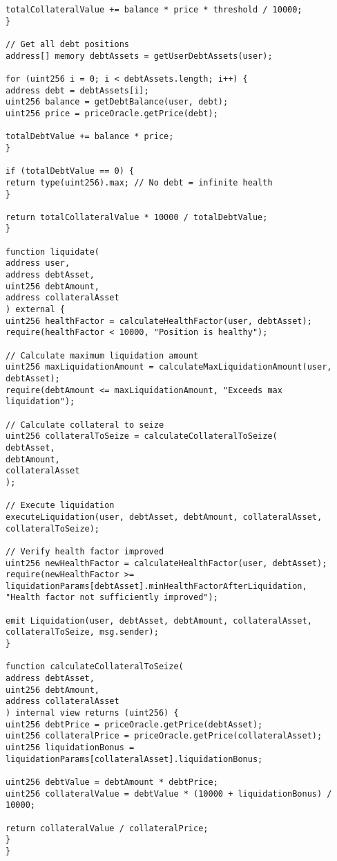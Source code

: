 \documentclass[12pt]{article}
\begin{document}
{{{\begin{lstlisting}
totalCollateralValue += balance * price * threshold / 10000;
}

// Get all debt positions
address[] memory debtAssets = getUserDebtAssets(user);

for (uint256 i = 0; i < debtAssets.length; i++) {
address debt = debtAssets[i];
uint256 balance = getDebtBalance(user, debt);
uint256 price = priceOracle.getPrice(debt);

totalDebtValue += balance * price;
}

if (totalDebtValue == 0) {
return type(uint256).max; // No debt = infinite health
}

return totalCollateralValue * 10000 / totalDebtValue;
}

function liquidate(
address user,
address debtAsset,
uint256 debtAmount,
address collateralAsset
) external {
uint256 healthFactor = calculateHealthFactor(user, debtAsset);
require(healthFactor < 10000, "Position is healthy");

// Calculate maximum liquidation amount
uint256 maxLiquidationAmount = calculateMaxLiquidationAmount(user, debtAsset);
require(debtAmount <= maxLiquidationAmount, "Exceeds max liquidation");

// Calculate collateral to seize
uint256 collateralToSeize = calculateCollateralToSeize(
debtAsset,
debtAmount,
collateralAsset
);

// Execute liquidation
executeLiquidation(user, debtAsset, debtAmount, collateralAsset, collateralToSeize);

// Verify health factor improved
uint256 newHealthFactor = calculateHealthFactor(user, debtAsset);
require(newHealthFactor >= liquidationParams[debtAsset].minHealthFactorAfterLiquidation,
"Health factor not sufficiently improved");

emit Liquidation(user, debtAsset, debtAmount, collateralAsset, collateralToSeize, msg.sender);
}

function calculateCollateralToSeize(
address debtAsset,
uint256 debtAmount,
address collateralAsset
) internal view returns (uint256) {
uint256 debtPrice = priceOracle.getPrice(debtAsset);
uint256 collateralPrice = priceOracle.getPrice(collateralAsset);
uint256 liquidationBonus = liquidationParams[collateralAsset].liquidationBonus;

uint256 debtValue = debtAmount * debtPrice;
uint256 collateralValue = debtValue * (10000 + liquidationBonus) / 10000;

return collateralValue / collateralPrice;
}
}
\end{lstlisting}

}}}
\end{document}
